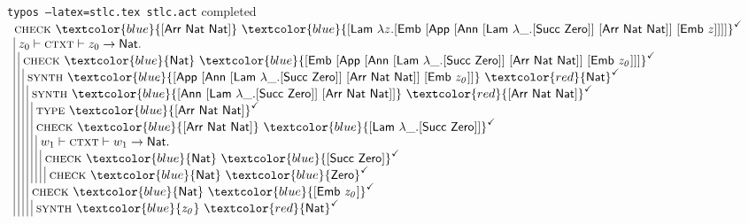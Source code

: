 \documentclass[xcolor=usenames,dvipsnames]{beamer}
\makeatletter
\newcommand{\typosBinding}[1]{#1 \vdash}
\newcommand{\typosPushing}[3]{\textsc{#1} \vdash #2 \to #3.}
\newcommand{\typosScope}[2]{\lambda #1. #2}
\newcommand{\typosAxiom}[1]{#1}
\newcommand{\typosDerivation}[2]{#1 \\ #2}
\newcommand{\typosBeginPrems}{\begin{array}{|@{\ }l@{}}}
\newcommand{\typosBetweenPrems}{\\}
\newcommand{\typosEndPrems}{\end{array}}
\newcommand{\typosInput}[1]{\textcolor{blue}{#1}}
\newcommand{\typosOutput}[1]{\textcolor{red}{#1}}
\newcommand{\typosCheckmark}{^\checkmark}
\newcommand{\enumNat}[0]{\mathsf{Nat}}
\newcommand{\enumZero}[0]{\mathsf{Zero}}
\newcommand{\tagAnnForTwo}[2]{[ \mathsf{Ann} \ #1 \ #2 ]}
\newcommand{\tagAppForTwo}[2]{[ \mathsf{App} \ #1 \ #2 ]}
\newcommand{\tagArrForTwo}[2]{[ \mathsf{Arr} \ #1 \ #2 ]}
\newcommand{\tagEmbForOne}[1]{[ \mathsf{Emb} \ #1 ]}
\newcommand{\tagLamForOne}[1]{[ \mathsf{Lam} \ #1 ]}
\newcommand{\tagSuccForOne}[1]{[ \mathsf{Succ} \ #1 ]}
\newcommand{\callingtype}[1]{\textsc{type}\ #1}
\newcommand{\callingcheck}[2]{\textsc{check}\ #1 \ #2}
\newcommand{\callingsynth}[2]{\textsc{synth}\ #1 \ #2}
\makeatother
\begin{document}
\begin{frame}[fragile]{\texttt{typos --latex=stlc.tex stlc.act} completed}
$\displaystyle
\begin{array}{l}
\typosDerivation{\callingcheck{\typosInput{\tagArrForTwo{\enumNat}{\enumNat}}}{\typosInput{\tagLamForOne{\typosScope{z}{\tagEmbForOne{\tagAppForTwo{\tagAnnForTwo{\tagLamForOne{\typosScope{\_}{\tagSuccForOne{\enumZero}}}}{\tagArrForTwo{\enumNat}{\enumNat}}}{\tagEmbForOne{\mathit{z}}}}}}}} \typosCheckmark}
 {\typosBeginPrems
  \typosDerivation{\typosBinding{z_0}\typosPushing{ctxt}{z_0}{\enumNat}}
   {\typosBeginPrems
    \typosDerivation{\callingcheck{\typosInput{\enumNat}}{\typosInput{\tagEmbForOne{\tagAppForTwo{\tagAnnForTwo{\tagLamForOne{\typosScope{\_}{\tagSuccForOne{\enumZero}}}}{\tagArrForTwo{\enumNat}{\enumNat}}}{\tagEmbForOne{\mathit{z_0}}}}}} \typosCheckmark}
     {\typosBeginPrems
      \typosDerivation{\callingsynth{\typosInput{\tagAppForTwo{\tagAnnForTwo{\tagLamForOne{\typosScope{\_}{\tagSuccForOne{\enumZero}}}}{\tagArrForTwo{\enumNat}{\enumNat}}}{\tagEmbForOne{\mathit{z_0}}}}}{\typosOutput{\enumNat}} \typosCheckmark}
       {\typosBeginPrems
        \typosDerivation{\callingsynth{\typosInput{\tagAnnForTwo{\tagLamForOne{\typosScope{\_}{\tagSuccForOne{\enumZero}}}}{\tagArrForTwo{\enumNat}{\enumNat}}}}{\typosOutput{\tagArrForTwo{\enumNat}{\enumNat}}} \typosCheckmark}
         {\typosBeginPrems
          \typosAxiom{\callingtype{\typosInput{\tagArrForTwo{\enumNat}{\enumNat}}} \typosCheckmark}
          \typosBetweenPrems
          \typosDerivation{\callingcheck{\typosInput{\tagArrForTwo{\enumNat}{\enumNat}}}{\typosInput{\tagLamForOne{\typosScope{\_}{\tagSuccForOne{\enumZero}}}}} \typosCheckmark}
           {\typosBeginPrems
            \typosDerivation{\typosBinding{w_1}\typosPushing{ctxt}{w_1}{\enumNat}}
             {\typosBeginPrems
              \typosDerivation{\callingcheck{\typosInput{\enumNat}}{\typosInput{\tagSuccForOne{\enumZero}}} \typosCheckmark}
               {\typosBeginPrems
                \typosAxiom{\callingcheck{\typosInput{\enumNat}}{\typosInput{\enumZero}} \typosCheckmark}
                \typosEndPrems}
              \typosEndPrems}
            \typosEndPrems}
          \typosEndPrems}
        \typosBetweenPrems
        \typosDerivation{\callingcheck{\typosInput{\enumNat}}{\typosInput{\tagEmbForOne{\mathit{z_0}}}} \typosCheckmark}
         {\typosBeginPrems
          \typosAxiom{\callingsynth{\typosInput{\mathit{z_0}}}{\typosOutput{\enumNat}} \typosCheckmark}
          \typosEndPrems}
        \typosEndPrems}
      \typosEndPrems}
    \typosEndPrems}
  \typosEndPrems}
\end{array}
$
\end{frame}
\end{document}
